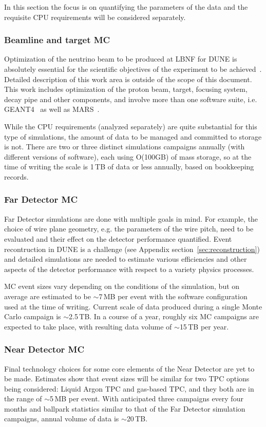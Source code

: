 In this section the focus is on quantifying the parameters of the data and the requisite CPU requirements will be considered separately.

\subsubsection{Beamline and target MC}
Optimization of the neutrino beam to be produced at LBNF for DUNE is absolutely essential for the scientific objectives of the experiment
to be achieved~\cite{cdr_vol2}. Detailed description of this work area is outside of the scope of this document. This work includes
optimization of the proton beam, target, focusing system, decay pipe and other components, and involve more than one software suite,
i.e. GEANT4~\cite{geant4} as well as MARS~\cite{mars}.

While the CPU requirements (analyzed separately) are quite substantial for this type of simulations, the amount of data to be managed
and committed to storage is not. There are two or three distinct simulations campaigns annually (with different versions of software),
each using O(100GB) of mass storage, so at the time of writing the scale is 1\,TB of data or less annually, based on bookkeeping records.

\subsubsection{Far Detector MC}
Far Detector simulations are done with multiple goals in mind. For example, the choice of wire plane geometry, e.g. the parameters of the wire
pitch, need to be evaluated and their effect on the detector performance quantified. Event recontruction in DUNE is a challenge (see
Appendix section~\ref{sec:reconstruction}) and detailed simulations are needed to estimate various efficiencies and other aspects
of the detector performance with respect to a variety physics processes.

MC event sizes vary depending on the conditions of the simulation, but on average are estimated to be $\sim$7\,MB per event
with the software configuration used at the time of writing. Current scale of data produced during a single Monte Carlo
campaign is $\sim$2.5\,TB. In a course of a year, roughly six MC campaigns are expected to take place, with resulting data volume of $\sim$15\,TB per year.

\subsubsection{Near Detector MC}
Final technology choices for some core elements of the Near Detector are yet to be made. Estimates show that event sizes will be similar
for two TPC options being considered: Liquid Argon TPC and gas-based TPC, and they both are in the range of $\sim$5\,MB per event.
With anticipated three campaigns every four months and ballpark statistics similar to that of the Far Detector simulation campaigns,
annual volume of data is $\sim$20\,TB.


